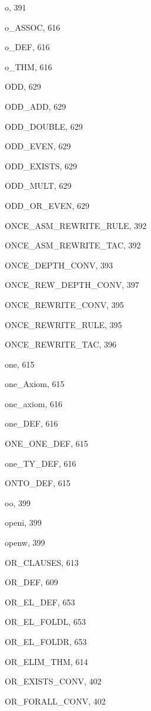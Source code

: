 \begin{theindex}
  \item {\ptt o}, 391
  \item {\ptt o\_ASSOC}, 616
  \item {\ptt o\_DEF}, 616
  \item {\ptt o\_THM}, 616
  \item {\ptt ODD}, 629
  \item {\ptt ODD\_ADD}, 629
  \item {\ptt ODD\_DOUBLE}, 629
  \item {\ptt ODD\_EVEN}, 629
  \item {\ptt ODD\_EXISTS}, 629
  \item {\ptt ODD\_MULT}, 629
  \item {\ptt ODD\_OR\_EVEN}, 629
  \item {\ptt ONCE\_ASM\_REWRITE\_RULE}, 392
  \item {\ptt ONCE\_ASM\_REWRITE\_TAC}, 392
  \item {\ptt ONCE\_DEPTH\_CONV}, 393
  \item {\ptt ONCE\_REW\_DEPTH\_CONV}, 397
  \item {\ptt ONCE\_REWRITE\_CONV}, 395
  \item {\ptt ONCE\_REWRITE\_RULE}, 395
  \item {\ptt ONCE\_REWRITE\_TAC}, 396
  \item {\ptt one}, 615
  \item {\ptt one\_Axiom}, 615
  \item {\ptt one\_axiom}, 616
  \item {\ptt one\_DEF}, 616
  \item {\ptt ONE\_ONE\_DEF}, 615
  \item {\ptt one\_TY\_DEF}, 616
  \item {\ptt ONTO\_DEF}, 615
  \item {\ptt oo}, 399
  \item {\ptt openi}, 399
  \item {\ptt openw}, 399
  \item {\ptt OR\_CLAUSES}, 613
  \item {\ptt OR\_DEF}, 609
  \item {\ptt OR\_EL\_DEF}, 653
  \item {\ptt OR\_EL\_FOLDL}, 653
  \item {\ptt OR\_EL\_FOLDR}, 653
  \item {\ptt OR\_ELIM\_THM}, 614
  \item {\ptt OR\_EXISTS\_CONV}, 402
  \item {\ptt OR\_FORALL\_CONV}, 402

\end{theindex}

